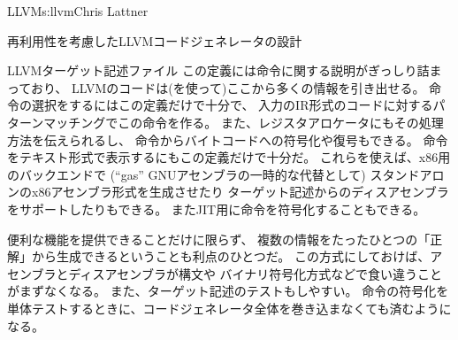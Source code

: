 \begin{aosachapter}{LLVM}{s:llvm}{Chris Lattner}
\begin{aosasect1}{再利用性を考慮したLLVMコードジェネレータの設計}
\begin{aosasect2}{LLVMターゲット記述ファイル}
この定義には命令に関する説明がぎっしり詰まっており、
LLVMのコードは(を使って)ここから多くの情報を引き出せる。
命令の選択をするにはこの定義だけで十分で、
入力のIR形式のコードに対するパターンマッチングでこの命令を作る。
また、レジスタアロケータにもその処理方法を伝えられるし、
命令からバイトコードへの符号化や復号もできる。
命令をテキスト形式で表示するにもこの定義だけで十分だ。
これらを使えば、x86用のバックエンドで
(``gas'' GNUアセンブラの一時的な代替として)
スタンドアロンのx86アセンブラ形式を生成させたり
ターゲット記述からのディスアセンブラをサポートしたりもできる。
またJIT用に命令を符号化することもできる。

便利な機能を提供できることだけに限らず、
複数の情報をたったひとつの「正解」から生成できるということも利点のひとつだ。
この方式にしておけば、アセンブラとディスアセンブラが構文や
バイナリ符号化方式などで食い違うことがまずなくなる。
また、ターゲット記述のテストもしやすい。
命令の符号化を単体テストするときに、コードジェネレータ全体を巻き込まなくても済むようになる。


\end{aosasect2}
\end{aosasect1}
\end{aosachapter}
